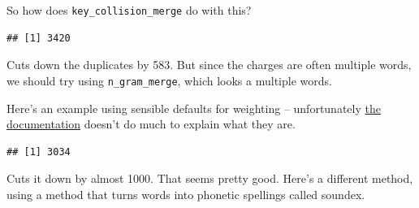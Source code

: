 \documentclass[]{book}
\newenvironment{Shaded}{\begin{snugshade}}{\end{snugshade}}
\newcommand{\DataTypeTok}[1]{\textcolor[rgb]{0.13,0.29,0.53}{#1}}
\newcommand{\DecValTok}[1]{\textcolor[rgb]{0.00,0.00,0.81}{#1}}
\newcommand{\FloatTok}[1]{\textcolor[rgb]{0.00,0.00,0.81}{#1}}
\newcommand{\KeywordTok}[1]{\textcolor[rgb]{0.13,0.29,0.53}{\textbf{#1}}}
\newcommand{\NormalTok}[1]{#1}
\newcommand{\OperatorTok}[1]{\textcolor[rgb]{0.81,0.36,0.00}{\textbf{#1}}}
\newcommand{\StringTok}[1]{\textcolor[rgb]{0.31,0.60,0.02}{#1}}
\begin{document}
So how does \texttt{key\_collision\_merge} do with this?

\begin{Shaded}
\end{Shaded}

\begin{verbatim}
## [1] 3420
\end{verbatim}

Cuts down the duplicates by 583. But since the charges are often multiple words, we should try using \texttt{n\_gram\_merge}, which looks a multiple words.

Here's an example using sensible defaults for weighting -- unfortunately \href{https://github.com/ChrisMuir/refinr}{the documentation} doesn't do much to explain what they are.

\begin{Shaded}
\end{Shaded}

\begin{verbatim}
## [1] 3034
\end{verbatim}

Cuts it down by almost 1000. That seems pretty good. Here's a different method, using a method that turns words into phonetic spellings called soundex.
\end{document}
